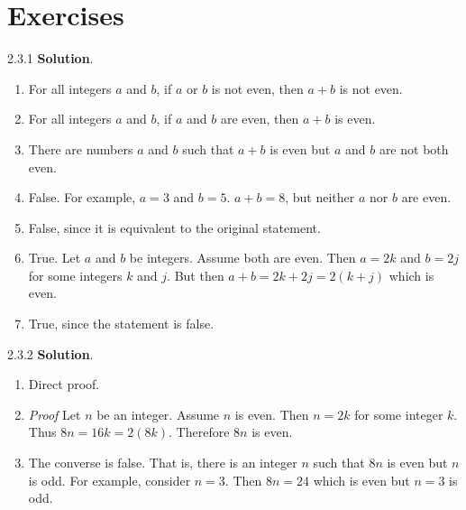 \documentclass[11pt,]{book}
\makeatletter
\theoremstyle{ptxplainnotitle}
\theoremstyle{ptxplaintitle}
\renewcommand*{\proofname}{Proof}
\renewenvironment{proof}[1][\proofname]{\par
  \pushQED{\qed}%
  \normalfont \topsep6\p@\@plus6\p@\relax
  \trivlist
  \item\relax
    {\itshape
    #1\@addpunct{.}}\hspace\labelsep\ignorespaces
}{%
  \popQED\endtrivlist\@endpefalse
}
\theoremstyle{ptxdefinitionnotitle}
\theoremstyle{ptxdefinitiontitle}
\theoremstyle{ptxdefinitionnotitle}
\theoremstyle{ptxdefinitiontitle}
\theoremstyle{ptxdefinitionnotitle}
\theoremstyle{ptxdefinitiontitle}
\theoremstyle{ptxdefinitiontitlenonumber}
\theoremstyle{ptxdefinitiontitlenonumber}
\numberwithin{equation}{chapter}
\makeatother
\begin{document}
\section*{Exercises}
\begin{divisionexercise}{2.3.1}
\textbf{Solution}.\quad%
\hypertarget{p-2611}{}%
\leavevmode%
\begin{enumerate}[label=(\alph*)]
\item\hypertarget{li-1301}{}\hypertarget{p-2612}{}%
For all integers \(a\) and \(b\), if \(a\) or \(b\) is not even, then \(a+b\) is not even.%
\item\hypertarget{li-1302}{}\hypertarget{p-2613}{}%
For all integers \(a\) and \(b\), if \(a\) and \(b\) are even, then \(a+b\) is even.%
\item\hypertarget{li-1303}{}\hypertarget{p-2614}{}%
There are numbers \(a\) and \(b\) such that \(a+b\) is even but \(a\) and \(b\) are not both even.%
\item\hypertarget{li-1304}{}\hypertarget{p-2615}{}%
False. For example, \(a = 3\) and \(b = 5\). \(a+b = 8\), but neither \(a\) nor \(b\) are even.%
\item\hypertarget{li-1305}{}\hypertarget{p-2616}{}%
False, since it is equivalent to the original statement.%
\item\hypertarget{li-1306}{}\hypertarget{p-2617}{}%
True. Let \(a\) and \(b\) be integers. Assume both are even. Then \(a = 2k\) and \(b = 2j\) for some integers \(k\) and \(j\). But then \(a+b = 2k + 2j = 2(k+j)\) which is even.%
\item\hypertarget{li-1307}{}\hypertarget{p-2618}{}%
True, since the statement is false.%
\end{enumerate}
%
\end{divisionexercise}%
\begin{divisionexercise}{2.3.2}
\textbf{Solution}.\quad%
\hypertarget{p-2623}{}%
\leavevmode%
\begin{enumerate}[label=(\alph*)]
\item\hypertarget{li-1310}{}\hypertarget{p-2624}{}%
Direct proof. \begin{proof}\hypertarget{proof-34}{}
\hypertarget{p-2625}{}%
Let \(n\) be an integer. Assume \(n\) is even. Then \(n = 2k\) for some integer \(k\). Thus \(8n = 16k = 2(8k)\). Therefore \(8n\) is even.%
\end{proof}
%
\item\hypertarget{li-1311}{}\hypertarget{p-2626}{}%
The converse is false. That is, there is an integer \(n\) such that \(8n\) is even but \(n\) is odd. For example, consider \(n = 3\). Then \(8n = 24\) which is even but \(n = 3\) is odd.%
\end{enumerate}
%
\end{divisionexercise}%
\end{document}
